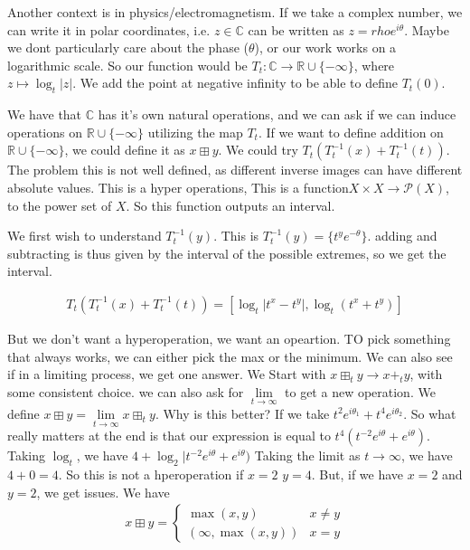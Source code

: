 \documentclass[11pt]{article}
\theoremstyle{definition}
\def\RR{{\mathbb R}}
\def\CC{{\mathbb C}}
\begin{document}
Another context is in physics/electromagnetism. If we take a complex number, we can write it in polar coordinates, i.e. $z \in \CC$ can be written as $z = rho e^{i \theta}$. Maybe we dont particularly care about the phase ($\theta$), or our work works on a logarithmic scale. So our function would be $T_t: \CC \rightarrow \RR\cup \{-\infty\}$, where $z \mapsto \log_t|z|$. We add the point at negative infinity to be able to define $T_t(0)$.


We have that $\CC$ has it's own natural operations, and we can ask if we can induce operations on $\RR\cup \{-\infty\}$ utilizing the map $T_t$. If we want to define addition on $\RR\cup\{-\infty\}$, we could define it as $x \boxplus y$. We could try $ T_t( T_t^{-1}(x) + T_t^{-1}(t))$. The problem this is not well defined, as different inverse images can have different absolute values. This is a hyper operations, This is a function$ X \times X \rightarrow \mathcal{P}(X)$, to the power set of $X$. So this function outputs an interval.

We first wish to understand $T_t^{-1}(y)$. This is $T_t^{-1}(y) = \{t^ye^{-\theta}\}$. adding and subtracting is thus given by the interval of the possible extremes, so we get the interval.

\begin{align*}
    T_t( T_t^{-1}(x) + T_t^{-1}(t)) = [ \log_{t} |t^x-t^y|, \log_t(t^x+t^y)]
\end{align*}

But we don't want a hyperoperation, we want an opeartion. TO pick something that always works, we can either pick the max or the minimum. We can also see if in a limiting process, we get one answer.  We Start with $x \boxplus_t y \rightarrow x+_t y$, with some consistent choice. we can also ask for $\lim\limits_{t \rightarrow \infty}$ to get a new operation. We define $x \boxplus y = \lim\limits_{t \rightarrow \infty} x \boxplus_t y$. Why is this better? If we take $t^2e^{i\theta_1} + t^4 e^{i\theta_2}$. So what really matters at the end is that our expression is equal to $t^4(t^{-2}e^{i\theta} +e^{i\theta})$. Taking $\log_t$, we have $4+ \log_2|t^{-2}e^{i\theta} + e^{i\theta})$ Taking the limit as $t \rightarrow \infty$, we have $4+0=4$. So this is not a hperoperation if $x=2$ $y=4$. But, if we have $x=2$ and $y=2$, we get issues. We have
\begin{align*}
    x\boxplus y = \begin{cases}
        \max(x,y) & x \neq y
        \\
        (\infty, \max(x,y) ) & x =y
    \end{cases}
\end{align*}
\end{document}
